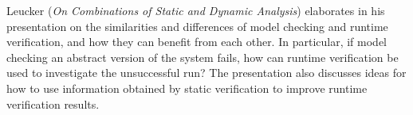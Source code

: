 

Leucker
\cite{isola-2016-leucker}
({\em On Combinations of Static and Dynamic Analysis})
elaborates in his presentation on the similarities and differences of
model checking and runtime verification, and how they can benefit
from each other. In particular, if model checking an abstract
version of the system fails, how can runtime verification be used to
investigate the unsuccessful run? The presentation also discusses ideas
for how to use information obtained by static verification to improve runtime
verification results.
